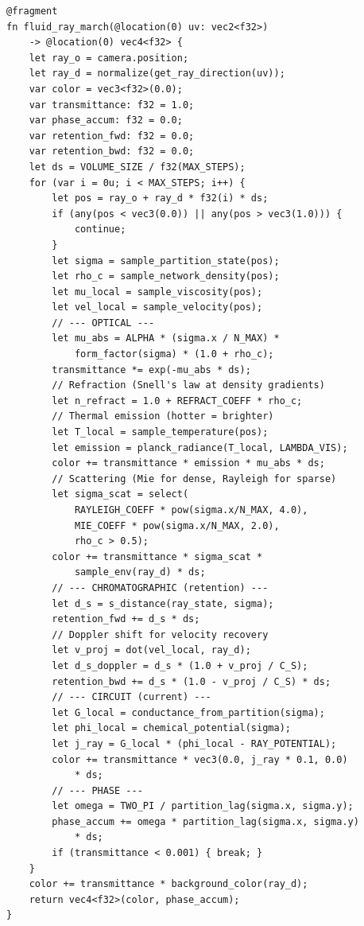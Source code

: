 \documentclass[twocolumn,10pt,a4paper]{article}
\theoremstyle{plain}
\theoremstyle{definition}
\theoremstyle{remark}
\begin{document}
\begin{lstlisting}[style=wgsl,caption={Pass 3: Fluid Ray March (WGSL)}]
@fragment
fn fluid_ray_march(@location(0) uv: vec2<f32>)
    -> @location(0) vec4<f32> {
    let ray_o = camera.position;
    let ray_d = normalize(get_ray_direction(uv));
    var color = vec3<f32>(0.0);
    var transmittance: f32 = 1.0;
    var phase_accum: f32 = 0.0;
    var retention_fwd: f32 = 0.0;
    var retention_bwd: f32 = 0.0;
    let ds = VOLUME_SIZE / f32(MAX_STEPS);
    for (var i = 0u; i < MAX_STEPS; i++) {
        let pos = ray_o + ray_d * f32(i) * ds;
        if (any(pos < vec3(0.0)) || any(pos > vec3(1.0))) {
            continue;
        }
        let sigma = sample_partition_state(pos);
        let rho_c = sample_network_density(pos);
        let mu_local = sample_viscosity(pos);
        let vel_local = sample_velocity(pos);
        // --- OPTICAL ---
        let mu_abs = ALPHA * (sigma.x / N_MAX) *
            form_factor(sigma) * (1.0 + rho_c);
        transmittance *= exp(-mu_abs * ds);
        // Refraction (Snell's law at density gradients)
        let n_refract = 1.0 + REFRACT_COEFF * rho_c;
        // Thermal emission (hotter = brighter)
        let T_local = sample_temperature(pos);
        let emission = planck_radiance(T_local, LAMBDA_VIS);
        color += transmittance * emission * mu_abs * ds;
        // Scattering (Mie for dense, Rayleigh for sparse)
        let sigma_scat = select(
            RAYLEIGH_COEFF * pow(sigma.x/N_MAX, 4.0),
            MIE_COEFF * pow(sigma.x/N_MAX, 2.0),
            rho_c > 0.5);
        color += transmittance * sigma_scat *
            sample_env(ray_d) * ds;
        // --- CHROMATOGRAPHIC (retention) ---
        let d_s = s_distance(ray_state, sigma);
        retention_fwd += d_s * ds;
        // Doppler shift for velocity recovery
        let v_proj = dot(vel_local, ray_d);
        let d_s_doppler = d_s * (1.0 + v_proj / C_S);
        retention_bwd += d_s * (1.0 - v_proj / C_S) * ds;
        // --- CIRCUIT (current) ---
        let G_local = conductance_from_partition(sigma);
        let phi_local = chemical_potential(sigma);
        let j_ray = G_local * (phi_local - RAY_POTENTIAL);
        color += transmittance * vec3(0.0, j_ray * 0.1, 0.0)
            * ds;
        // --- PHASE ---
        let omega = TWO_PI / partition_lag(sigma.x, sigma.y);
        phase_accum += omega * partition_lag(sigma.x, sigma.y)
            * ds;
        if (transmittance < 0.001) { break; }
    }
    color += transmittance * background_color(ray_d);
    return vec4<f32>(color, phase_accum);
}
\end{lstlisting}
\end{document}
